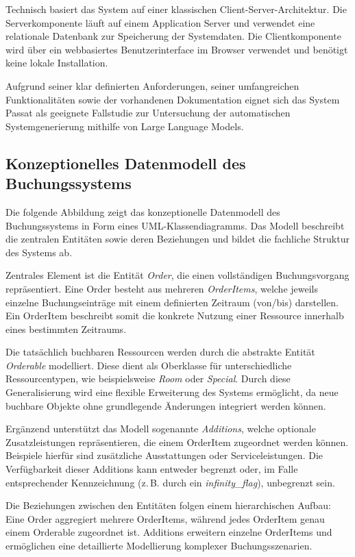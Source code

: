Technisch basiert das System auf einer klassischen
Client-Server-Architektur. Die Serverkomponente läuft auf einem
Application Server und verwendet eine relationale Datenbank
zur Speicherung der Systemdaten. Die Clientkomponente wird
über ein webbasiertes Benutzerinterface im Browser verwendet
und benötigt keine lokale Installation.

Aufgrund seiner klar definierten Anforderungen, seiner
umfangreichen Funktionalitäten sowie der vorhandenen
Dokumentation eignet sich das System Passat als geeignete
Fallstudie zur Untersuchung der automatischen
Systemgenerierung mithilfe von Large Language Models.

\subsection{Konzeptionelles Datenmodell des Buchungssystems}

Die folgende Abbildung zeigt das konzeptionelle
Datenmodell des Buchungssystems in Form eines
UML-Klassendiagramms. Das Modell beschreibt die
zentralen Entitäten sowie deren Beziehungen und
bildet die fachliche Struktur des Systems ab.

Zentrales Element ist die Entität \textit{Order}, die
einen vollständigen Buchungsvorgang repräsentiert.
Eine Order besteht aus mehreren \textit{OrderItems},
welche jeweils einzelne Buchungseinträge mit einem
definierten Zeitraum (von/bis) darstellen. Ein
OrderItem beschreibt somit die konkrete Nutzung
einer Ressource innerhalb eines bestimmten Zeitraums.

Die tatsächlich buchbaren Ressourcen werden durch die
abstrakte Entität \textit{Orderable} modelliert. Diese
dient als Oberklasse für unterschiedliche Ressourcentypen,
wie beispielsweise \textit{Room} oder \textit{Special}.
Durch diese Generalisierung wird eine flexible Erweiterung
des Systems ermöglicht, da neue buchbare Objekte ohne
grundlegende Änderungen integriert werden können.

Ergänzend unterstützt das Modell sogenannte
\textit{Additions}, welche optionale Zusatzleistungen
repräsentieren, die einem OrderItem zugeordnet werden
können. Beispiele hierfür sind zusätzliche Ausstattungen
oder Serviceleistungen. Die Verfügbarkeit dieser Additions
kann entweder begrenzt oder, im Falle entsprechender
Kennzeichnung (z.\,B. durch ein \textit{infinity\_flag}),
unbegrenzt sein.

Die Beziehungen zwischen den Entitäten folgen einem
hierarchischen Aufbau: Eine Order aggregiert mehrere
OrderItems, während jedes OrderItem genau einem
Orderable zugeordnet ist. Additions erweitern einzelne
OrderItems und ermöglichen eine detaillierte Modellierung
komplexer Buchungsszenarien.

